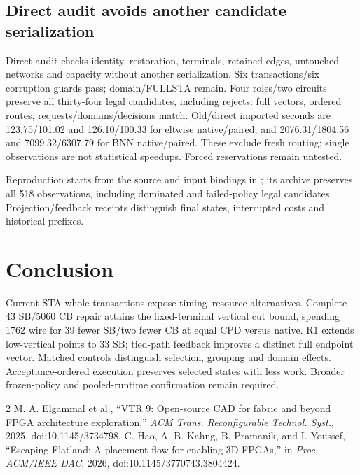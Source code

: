 \documentclass[conference,10pt]{IEEEtran}
\begin{document}
\subsection{Direct audit avoids another candidate serialization}
Direct audit checks identity, restoration, terminals, retained edges, untouched networks and capacity without another serialization. Six transactions/six corruption guards pass; domain/FULLSTA remain. Four roles/two circuits preserve all thirty-four legal candidates, including rejects: full vectors, ordered routes, requests/domains/decisions match. Old/direct imported seconds are 123.75/101.02 and 126.10/100.33 for eltwise native/paired, and 2076.31/1804.56 and 7099.32/6307.79 for BNN native/paired. These exclude fresh routing; single observations are not statistical speedups. Forced reservations remain untested.

Reproduction starts from the source and input bindings in ; its archive preserves all 518 observations, including dominated and failed-policy legal candidates. Projection/feedback receipts distinguish final states, interrupted costs and historical prefixes.

\section{Conclusion}
Current-STA whole transactions expose timing--resource alternatives. Complete 43 SB/5060 CB repair attains the fixed-terminal vertical cut bound, spending 1762 wire for 39 fewer SB/two fewer CB at equal CPD versus native. R1 extends low-vertical points to 33 SB; tied-path feedback improves a distinct full endpoint vector. Matched controls distinguish selection, grouping and domain effects. Acceptance-ordered execution preserves selected states with less work. Broader frozen-policy and pooled-runtime confirmation remain required.

\begin{thebibliography}{2}
 M. A. Elgammal et al., ``VTR 9: Open-source CAD for fabric and beyond FPGA architecture exploration,'' \emph{ACM Trans. Reconfigurable Technol. Syst.}, 2025, doi:10.1145/3734798.
 C. Hao, A. B. Kahng, B. Pramanik, and I. Youssef, ``Escaping Flatland: A placement flow for enabling 3D FPGAs,'' in \emph{Proc. ACM/IEEE DAC}, 2026, doi:10.1145/3770743.3804424.
\end{thebibliography}
\end{document}
